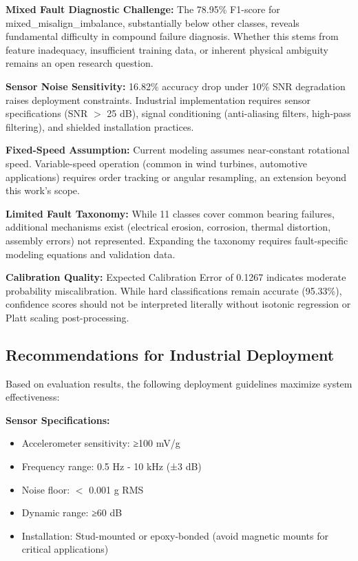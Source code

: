 \documentclass[11pt,a4paper]{article}
\begin{document}
\textbf{Mixed Fault Diagnostic Challenge:} The 78.95\% F1-score for mixed\_misalign\_imbalance, substantially below other classes, reveals fundamental difficulty in compound failure diagnosis. Whether this stems from feature inadequacy, insufficient training data, or inherent physical ambiguity remains an open research question.

\textbf{Sensor Noise Sensitivity:} 16.82\% accuracy drop under 10\% SNR degradation raises deployment constraints. Industrial implementation requires sensor specifications (SNR  $>$  25 dB), signal conditioning (anti-aliasing filters, high-pass filtering), and shielded installation practices.

\textbf{Fixed-Speed Assumption:} Current modeling assumes near-constant rotational speed. Variable-speed operation (common in wind turbines, automotive applications) requires order tracking or angular resampling, an extension beyond this work's scope.

\textbf{Limited Fault Taxonomy:} While 11 classes cover common bearing failures, additional mechanisms exist (electrical erosion, corrosion, thermal distortion, assembly errors) not represented. Expanding the taxonomy requires fault-specific modeling equations and validation data.

\textbf{Calibration Quality:} Expected Calibration Error of 0.1267 indicates moderate probability miscalibration. While hard classifications remain accurate (95.33\%), confidence scores should not be interpreted literally without isotonic regression or Platt scaling post-processing.

\subsection{Recommendations for Industrial Deployment}

Based on evaluation results, the following deployment guidelines maximize system effectiveness:

\textbf{Sensor Specifications:}
\begin{itemize}[itemsep=0.2em]
    \item Accelerometer sensitivity: ≥100 mV/g
    \item Frequency range: 0.5 Hz - 10 kHz (±3 dB)
    \item Noise floor:  $<$ 0.001 g RMS
    \item Dynamic range: ≥60 dB
    \item Installation: Stud-mounted or epoxy-bonded (avoid magnetic mounts for critical applications)
\end{itemize}
\end{document}
